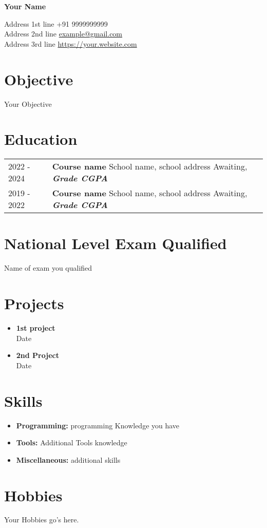 \documentclass[12pt]{article}
\begin{document}
\begin{center}
     \Huge{\textbf{Your Name}}
\end{center}
Address 1st line \hfill +91 9999999999\\
Address 2nd line \hfill \href{mailto:example@gmail.com}{example@gmail.com} \\ 
Address 3rd line \hfill \url{https://your.website.com}

\section{Objective}
Your Objective


\section{Education}
\begin{tabular}{ l p{15in} }
    2022 - 2024 & \textbf{Course name} \newline School name, school address 
    \newline Awaiting, \textbf{\textit{Grade CGPA}} \\ 

    2019 - 2022 & \textbf{Course name} \newline School name, school address 
    \newline Awaiting, \textbf{\textit{Grade CGPA}} \\ 
\end{tabular}

\section{National Level Exam Qualified}
Name of exam you qualified

\section{Projects}
\begin{itemize}
    \itemsep=-0em
    \item \textbf{1st project} \\ 
Date
    \item \textbf{2nd Project} \\ 
Date
\end{itemize}

\section{Skills}
\begin{itemize}
    \itemsep=-.3em
    \item \textbf{Programming:} programming Knowledge you have
    \item \textbf{Tools:} Additional Tools knowledge
    \item \textbf{Miscellaneous:} additional skills
\end{itemize}

\section{Hobbies}
Your Hobbies go's here.
\end{document}
